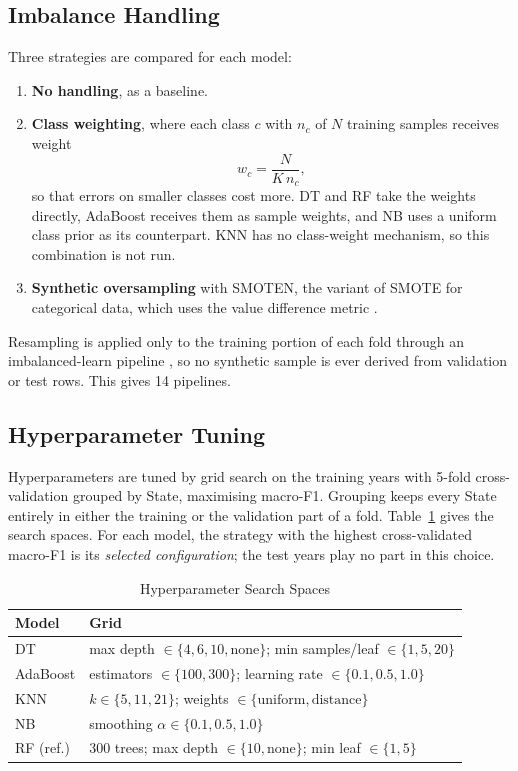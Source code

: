\documentclass[conference]{IEEEtran}
\begin{document}
\subsection{Imbalance Handling}
Three strategies are compared for each model:
\begin{enumerate}
\item \textbf{No handling}, as a baseline.
\item \textbf{Class weighting}, where each class $c$ with $n_c$ of $N$ training samples receives weight
\begin{equation}
w_c = \frac{N}{K\, n_c},
\end{equation}
so that errors on smaller classes cost more. DT and RF take the weights directly, AdaBoost receives them as sample weights, and NB uses a uniform class prior as its counterpart. KNN has no class-weight mechanism, so this combination is not run.
\item \textbf{Synthetic oversampling} with SMOTEN, the variant of SMOTE \cite{chawla2002} for categorical data, which uses the value difference metric \cite{stanfill1986}.
\end{enumerate}
Resampling is applied only to the training portion of each fold through an imbalanced-learn pipeline \cite{lemaitre2017}, so no synthetic sample is ever derived from validation or test rows. This gives 14 pipelines.

\subsection{Hyperparameter Tuning}
Hyperparameters are tuned by grid search on the training years with 5-fold cross-validation grouped by State, maximising macro-F1. Grouping keeps every State entirely in either the training or the validation part of a fold. Table~\ref{tab:grids} gives the search spaces. For each model, the strategy with the highest cross-validated macro-F1 is its \emph{selected configuration}; the test years play no part in this choice.

\begin{table}[t]
\caption{Hyperparameter Search Spaces}
\label{tab:grids}
\centering
\footnotesize
\begin{tabular}{@{}lp{6.4cm}@{}}
\toprule
Model & Grid \\
\midrule
DT & max depth $\in \{4, 6, 10, \text{none}\}$; min samples/leaf $\in \{1, 5, 20\}$ \\
AdaBoost & estimators $\in \{100, 300\}$; learning rate $\in \{0.1, 0.5, 1.0\}$ \\
KNN & $k \in \{5, 11, 21\}$; weights $\in \{\text{uniform}, \text{distance}\}$ \\
NB & smoothing $\alpha \in \{0.1, 0.5, 1.0\}$ \\
RF (ref.) & 300 trees; max depth $\in \{10, \text{none}\}$; min leaf $\in \{1, 5\}$ \\
\bottomrule
\end{tabular}
\end{table}
\end{document}

